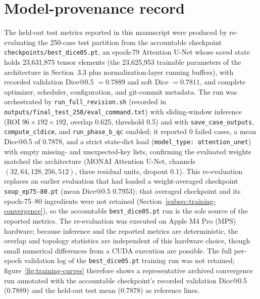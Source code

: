 \documentclass[anonymous]{iopjournal}
\begin{document}
\section{Model-provenance record}
\label{app:provenance}

The held-out test metrics reported in this manuscript were produced by re-evaluating the 250-case test partition from the accountable checkpoint \texttt{checkpoints/best\_dice05.pt}, an epoch-79 Attention U-Net whose saved state holds 23{,}631{,}875 tensor elements (the 23{,}625{,}953 trainable parameters of the architecture in Section~3.3 plus normalization-layer running buffers), with recorded validation Dice@0.5 $=0.7889$ and soft Dice $=0.7811$, and complete optimizer, scheduler, configuration, and git-commit metadata. The run was orchestrated by \texttt{run\_full\_revision.sh} (recorded in \texttt{outputs/final\_test\_250/eval\_command.txt}) with sliding-window inference (ROI $96\times192\times192$, overlap 0.625, threshold 0.5) and with \texttt{save\_case\_outputs}, \texttt{compute\_cldice}, and \texttt{run\_phase\_b\_qc} enabled; it reported 0 failed cases, a mean Dice@0.5 of 0.7878, and a strict state-dict load (\texttt{model\_type: attention\_unet}) with empty missing- and unexpected-key lists, confirming the evaluated weights matched the architecture (MONAI Attention U-Net, channels $(32,64,128,256,512)$, three residual units, dropout 0.1). This re-evaluation replaces an earlier evaluation that had loaded a weight-averaged checkpoint \texttt{soup\_ep75-80.pt} (mean Dice@0.5 0.7953); that averaged checkpoint and its epoch-75--80 ingredients were not retained (Section~\ref{subsec:training-convergence}), so the accountable \texttt{best\_dice05.pt} run is the sole source of the reported metrics. The re-evaluation was executed on Apple M4 Pro (MPS) hardware; because inference and the reported metrics are deterministic, the overlap and topology statistics are independent of this hardware choice, though small numerical differences from a CUDA execution are possible. The full per-epoch validation log of the \texttt{best\_dice05.pt} training run was not retained; figure~\ref{fig:training-curves} therefore shows a representative archived convergence run annotated with the accountable checkpoint's recorded validation Dice@0.5 (0.7889) and the held-out test mean (0.7878) as reference lines.

\newpage


\end{document}
